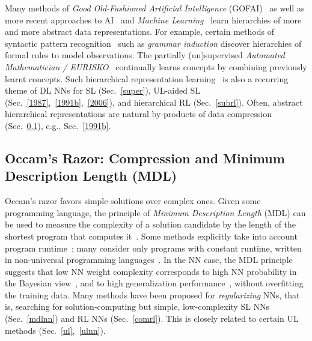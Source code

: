 \documentclass[letterpaper]{article}
\begin{document}
\begin{CJK*}{UTF8}{gbsn}
Many methods of 
{\em  Good Old-Fashioned Artificial Intelligence} (GOFAI)~\citep{Nilsson:80} 
as well as more recent approaches to AI~\citep{russell1995} and {\em Machine Learning}~\citep{Mitchell:97} 
learn hierarchies of more and more abstract data representations.
For example, certain methods of syntactic pattern recognition~\citep{Fu:77} such as
{\em grammar induction} discover hierarchies of  
formal rules to model observations.
The partially (un)supervised
{\em Automated Mathematician / EURISKO}~\citep{Lenat:83,Lenat:84} continually learns   
concepts by combining previously learnt concepts.
Such hierarchical representation learning~\citep{Ring:94,bengio2013tpami,lideng2014} is also a recurring theme of
DL NNs for SL (Sec.~\ref{super}), 
UL-aided SL (Sec.~\ref{1987},~\ref{1991b},~\ref{2006}), 
and hierarchical RL (Sec.~\ref{subrl}).
Often, abstract hierarchical representations are natural by-products of
data compression (Sec.~\ref{mdl}), e.g., Sec.~\ref{1991b}. 


\subsection{Occam's Razor: Compression and Minimum Description Length (MDL)}
\label{mdl}

Occam's razor favors simple solutions over complex ones.
Given some programming language,
the principle of {\em Minimum Description Length} (MDL) can be used 
to measure the complexity of a solution candidate by
the length of the shortest program that 
computes it~\citep[e.g.,][]{Solomonoff:64,Kolmogorov:65,Chaitin:66,Wallace:68,Levin:73a,Solomonoff:78,Rissanen:86,Blumer:87,LiVitanyi:97,gruenwald2005}.
Some methods explicitly take into account program runtime~\citep{Allender:92,Watanabe:92,Schmidhuber:97nn+,Schmidhuber:02colt}; 
many consider only programs with constant runtime, written
in non-universal programming languages~\citep[e.g.,][]{Rissanen:86,Hinton:93}.
In the NN case, 
the MDL principle suggests that low NN weight complexity
corresponds to high NN probability 
in the  Bayesian view~\citep[e.g.,][]{MacKay:92b,Buntine:91,neal1995,freitas2003},
and to high generalization performance~\citep[e.g.,][]{BaumHaussler:89}, 
without overfitting the training data.
Many methods have been proposed for {\em regularizing} NNs, that is, 
searching for solution-computing but simple, low-complexity SL NNs (Sec.~\ref{mdlnn}) 
and RL NNs (Sec.~\ref{comrl}).
This is closely 
related to certain UL methods (Sec.~\ref{ul},~\ref{ulnn}).




\end{CJK*}
\end{document}
